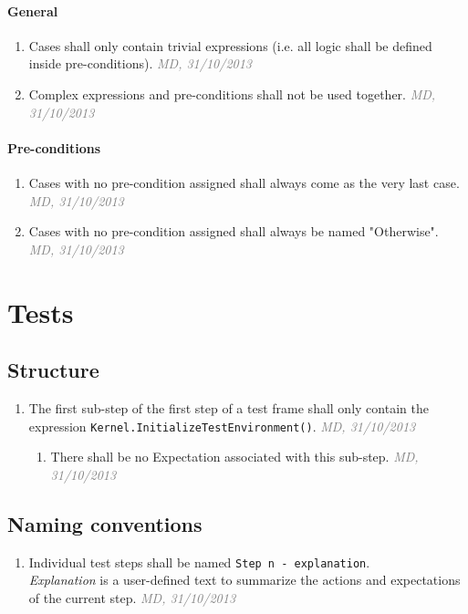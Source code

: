 \documentclass[draft, a4paper, oneside]{scrreprt}
\let\emph\textsl
\newcommand{\code}[1]{\lstinline$#1$}
\newcommand{\ruleauthor}[2]{\mbox{}\newline\mbox{}\hfill{\footnotesize\textcolor{gray}{\emph{#1, #2}}}\xspace}
\begin{document}
\subsubsection{General}
\begin{enumerate}
\item \label{rule:functions_cases_general_trivialexpressions} Cases shall only contain trivial expressions (i.e. all logic shall be defined inside pre-conditions). \ruleauthor{MD}{31/10/2013}
\item {} Complex expressions and pre-conditions shall not be used together.  \ruleauthor{MD}{31/10/2013}
\end{enumerate}

\subsubsection{Pre-conditions}
\begin{enumerate}
\item Cases with no pre-condition assigned shall always come as the very last case. \ruleauthor{MD}{31/10/2013}
\item Cases with no pre-condition assigned shall always be named "Otherwise". \ruleauthor{MD}{31/10/2013}
\end{enumerate}

\chapter{Tests}

\section{Structure}
\begin{enumerate}
\item The first sub-step of the first step of a test frame shall only contain the expression \code{Kernel.InitializeTestEnvironment()}. \ruleauthor{MD}{31/10/2013}
\begin{enumerate}
\item There shall be no Expectation associated with this sub-step. \ruleauthor{MD}{31/10/2013}
\end{enumerate}
\end{enumerate}


\section{Naming conventions}
\begin{enumerate}
\item Individual test steps shall be named \code{Step n - explanation}.\\ \emph{Explanation} is a user-defined text to summarize the actions and expectations of the current step. \ruleauthor{MD}{31/10/2013}
\end{enumerate}
\end{document}
